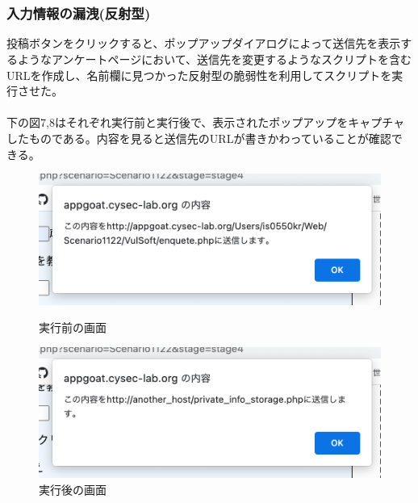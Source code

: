 \documentclass[dvipdfmx,autodetect-engine,titlepage]{jsarticle}
\begin{document}
　\\\\

\subsubsection{入力情報の漏洩(反射型)}
投稿ボタンをクリックすると、ポップアップダイアログによって送信先を表示するようなアンケートページにおいて、送信先を変更するようなスクリプトを含むURLを作成し、名前欄に見つかった反射型の脆弱性を利用してスクリプトを実行させた。\\\\
下の図7,8はそれぞれ実行前と実行後で、表示されたポップアップをキャプチャしたものである。内容を見ると送信先のURLが書きかわっていることが確認できる。

\begin{figure}[H]
  \centering
  \begin{minipage}[b]{0.45\linewidth}
  \begin{center}
    \includegraphics[keepaspectratio,scale=0.4]{web7.png}
    \end{center}
    \caption{実行前の画面}
  \end{minipage}
  \begin{minipage}[b]{0.45\linewidth}
  \begin{center}
    \includegraphics[keepaspectratio,scale=0.4]{web8.png}
    \end{center}
    \caption{実行後の画面}
  \end{minipage}
\end{figure}
\end{document}
